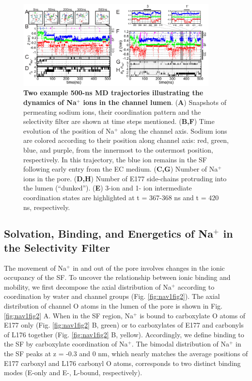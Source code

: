 \begin{refsection}
\begin{figure}[!ptb]
\centering
\includegraphics[width=0.9\textwidth]{nav1/Nav1FigS2}
\caption[Two example 500-ns MD trajectories illustrating the dynamics of Na$^+$ ions in the channel lumen]{\textbf{Two example 500-ns MD trajectories illustrating the dynamics of Na$^+$ ions in the channel lumen}. (\textbf{A}) Snapshots of permeating sodium ions, their coordination pattern and the selectivity filter are shown at time steps mentioned.  (\textbf{B,F}) Time evolution of the position of Na$^+$ along the channel axis.  Sodium ions are colored according to their position along channel axis: red, green, blue, and purple, from the innermost to the outermost position, respectively.  In this trajectory, the blue ion remains in the SF following early entry from the EC medium.  (\textbf{C,G}) Number of Na$^+$ ions in the pore. (\textbf{D,H}) Number of E177 side-chains protruding into the lumen (``dunked''). (\textbf{E}) 3-ion and 1- ion intermediate coordination states are highlighted at t = 367-368 ns and t = 420 ns, respectively. }
\label{fig:nav1figS2}
\end{figure}

\subsection{Solvation, Binding, and Energetics of Na$^+$ in the Selectivity Filter}
The movement of Na$^+$ in and out of the pore involves changes in the ionic occupancy of the SF.  To uncover the relationship between ionic binding and mobility, we first decompose the axial distribution of Na$^+$ according to coordination by water and channel groups (Fig. \ref{fig:nav1fig2}).  The axial distribution of channel O atoms in the lumen of the pore is shown in Fig.  \ref{fig:nav1fig2} A.  When in the SF region, Na$^+$ is bound to carboxylate O atoms of E177 only (Fig. \ref{fig:nav1fig2} B, green) or to carboxylates of E177 and carbonyls of L176 together (Fig. \ref{fig:nav1fig2} B, yellow).  Accordingly, we define binding to the SF by carboxylate coordination of Na$^+$.  The bimodal distribution of Na$^+$ in the SF peaks at z = -0.3 and 0 nm, which nearly matches the average positions of E177 carboxyl and L176 carbonyl O atoms, corresponds to two distinct binding modes (E-only and E-, L-bound, respectively). 


\end{refsection}
